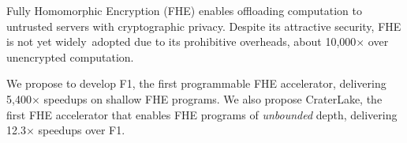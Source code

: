 Fully Homomorphic Encryption (FHE) enables offloading computation to untrusted
servers with cryptographic privacy. Despite its attractive security, FHE is not
yet widely~adopted due to its prohibitive overheads, about 10,000$\times$ over
unencrypted computation.

We propose to develop F1, the first programmable FHE accelerator, delivering
5,400$\times$ speedups on shallow FHE programs. We also propose CraterLake, the
first FHE accelerator that enables FHE programs of \emph{unbounded} depth,
delivering 12.3$\times$ speedups over F1.
